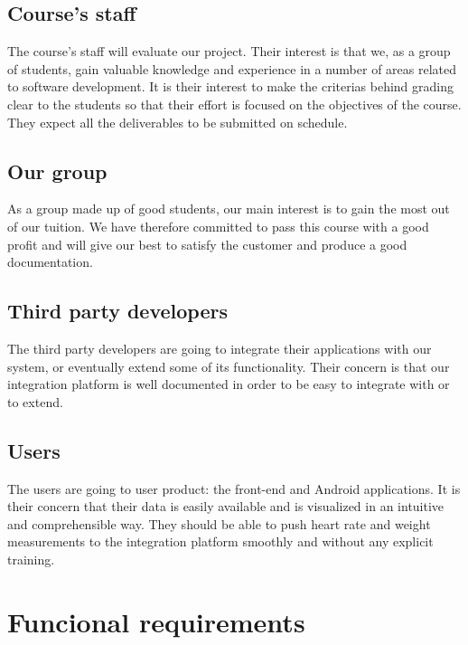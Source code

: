 \subsection{Course's staff}
The course's staff will evaluate our project. Their interest is that we, as a group of students,
gain valuable knowledge and experience in a number of areas related to software development.
It is their interest to make the criterias behind grading clear to the students
so that their effort is focused on the objectives of the course.
They expect all the deliverables to be submitted on schedule.

\subsection{Our group}
As a group made up of good students, our main interest is to gain the most out of our tuition.
We have therefore committed to pass this course with a good profit and will give our best
to satisfy the customer and produce a good documentation.

\subsection{Third party developers}
The third party developers are going to integrate their applications with our system, or eventually
extend some of its functionality. Their concern is that our integration platform is well documented
in order to be easy to integrate with or to extend.

\subsection{Users}
The users are going to user product: the front-end and Android applications.
It is their concern that their data is easily available and is visualized in an intuitive and comprehensible way.
They should be able to push heart rate and weight measurements to the integration platform smoothly and without
any explicit training.


\section{Funcional requirements}
\label{section:functionalreq}

